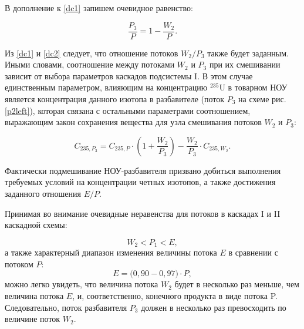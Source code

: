 В дополнение к \ref{dc1} запишем очевидное равенство:

\begin{equation}
    \label{dc2}
    \frac{P_{3}}{P} = 1 - \frac{W_{2}}{P}.
\end{equation}

Из \ref{dc1} и \ref{dc2} следует, что отношение потоков ${W_2}{/}{P_3}$ также будет заданным. Иными словами, соотношение между потоками $W_2$ и $P_3$ при их смешивании зависит от выбора параметров каскадов подсистемы I. В этом случае единственным параметром, влияющим на концентрацию $^{235}$U в товарном НОУ является концентрация данного изотопа в разбавителе (поток $P_3$ на схеме рис. \ref{p2left}), которая связана с остальными параметрами соотношением, выражающим закон сохранения вещества для узла смешивания потоков $W_2$ и $P_3$: 

\begin{equation}
    \label{dc3}
    C_{235,P_{3}}=C_{235,P} \cdot ({1 + \frac{W_{2}}{P_{3}}}) - \frac{W_{2}}{P_{3}}\cdot C_{235,W_{2}}.
\end{equation}

Фактически подмешивание НОУ-разбавителя призвано добиться выполнения требуемых условий на концентрации четных изотопов, а также достижения заданного отношения $E{/}P$.

Принимая во внимание очевидные неравенства для потоков в каскадах I и II каскадной схемы:

\begin{equation}
    \label{dc3a}
    W_{2} < P_{1} <  E,
\end{equation}
а также характерный диапазон изменения величины потока $E$ в сравнении с потоком $P$:
\begin{equation}
    \label{dc3b}
    E = {(}0,90-0,97{)} \cdot P,
\end{equation}
можно легко увидеть, что величина потока $W_{2}$ будет в несколько раз меньше, чем величина потока $E$, и, соответственно, конечного продукта в виде потока P. Следовательно, поток разбавителя $P_{3}$ должен в несколько раз превосходить по величине поток $W_{2}$. 


